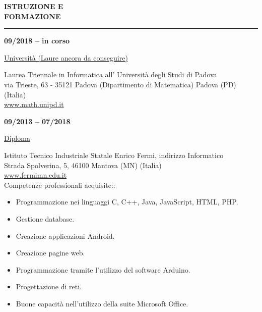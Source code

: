 \begin{minipage}[b]{0.3\textwidth}
	\textbf{ISTRUZIONE E \\FORMAZIONE}
\end{minipage}%
\hfill
\hfill
\begin{minipage}[t]{0.6\textwidth}		
	\rule{\textwidth}{0.4pt}
\end{minipage}%
\vspace{5mm}



\begin{minipage}[t]{0.3\textwidth}
	\textbf{09/2018 – in corso}
\end{minipage}%
\hfill
\hfill
\begin{minipage}[t]{0.6\textwidth}		
	\begin{Large}
		\underline{Università (Laure ancora da conseguire)} \vspace{5mm}\\
	\end{Large}
	Laurea Triennale in Informatica all' Università degli Studi di Padova\\
	via Trieste, 63 - 35121 Padova (Dipartimento di Matematica) Padova (PD) (Italia) \\
	\url{www.math.unipd.it} 
	\vspace{4mm}
\end{minipage}%


\begin{minipage}[t]{0.3\textwidth}
	\textbf{09/2013 – 07/2018}
\end{minipage}%
\hfill
\hfill
\begin{minipage}[t]{0.6\textwidth}		
	\begin{Large}
		\underline{Diploma} \vspace{5mm}\\
	\end{Large}
	Istituto Tecnico Industriale Statale Enrico Fermi, indirizzo Informatico\\
	Strada Spolverina, 5, 46100 Mantova (MN) (Italia) \\
	\url{www.fermimn.edu.it} \vspace{1mm}\\
	Competenze professionali acquisite::
	\begin{itemize}
		\item Programmazione nei linguaggi C, C++, Java, JavaScript, HTML, PHP.
		\item Gestione database.
		\item  Creazione applicazioni Android.
		\item Creazione pagine web.
		\item Programmazione tramite l'utilizzo del software Arduino.
		\item  Progettazione di reti.
		\item Buone capacità nell'utilizzo della suite Microsoft Office.
	\end{itemize} 
	\vspace{4mm}
\end{minipage}%